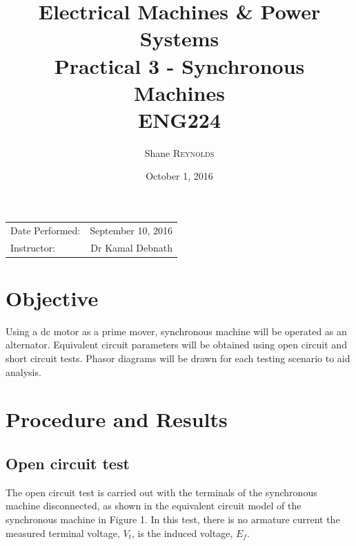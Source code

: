 \documentclass{article}
\title{Electrical Machines \& Power Systems \\ Practical 3 - Synchronous Machines \\ ENG224} %
\author{Shane \textsc{Reynolds}} %
\date{October 1, 2016} %
\begin{document}
\maketitle %

\begin{center}
\begin{tabular}{l r}
Date Performed: & September 10, 2016 \\ %
Instructor: & Dr Kamal Debnath %
\end{tabular}
\end{center}



\section{Objective}

Using a dc motor as a prime mover, synchronous machine will be operated as an alternator. Equivalent circuit parameters will be obtained using open circuit and short circuit tests. Phasor diagrams will be drawn for each testing scenario to aid analysis. 
 

\section{Procedure and Results}
\subsection{Open circuit test}

The open circuit test is carried out with the terminals of the synchronous machine disconnected, as shown in the equivalent circuit model of the synchronous machine in Figure 1. In this test, there is no armature current the measured terminal voltage, $V_t$, is the induced voltage, $E_f$.
\end{document}
